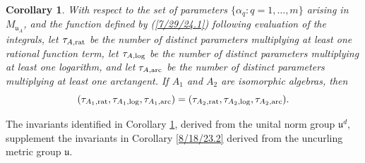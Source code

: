 \documentclass{amsart}
\numberwithin{equation}{section}
\newtheorem{corollary}[theorem]{Corollary}
\theoremstyle{definition}
\numberwithin{theorem}{section}
\begin{document}
\begin{corollary}\label{7/25/24.1} With respect to the set of parameters $\{\alpha_q:q=1,\dots,m\}$ arising in $M_{\mathfrak{u}_A}$, and the function defined by (\ref{7/29/24.1}) following evaluation of the integrals, let $\tau_{A,{\rm rat}}$ be the number of distinct parameters multiplying at least one rational function term, let $\tau_{A,{\rm log}}$ be the number of distinct parameters multiplying at least one logarithm, and let $\tau_{A,{\rm arc}}$ be the number of distinct parameters multiplying at least one arctangent.  If $A_1$ and $A_2$ are isomorphic algebras, then \[ (\tau_{A_1,{\rm rat}},\tau_{A_1,{\rm log}},\tau_{A_1,{\rm arc}}) = (\tau_{A_2,{\rm rat}},\tau_{A_2,{\rm log}},\tau_{A_2,{\rm arc}}).\]
\end{corollary}

The invariants identified in Corollary \ref{7/25/24.1}, derived from the unital norm group $\mathfrak{u}^d$, supplement the invariants in Corollary \ref{8/18/23.2} derived from the uncurling metric group $\mathfrak{u}$.


\medskip
\end{document}
